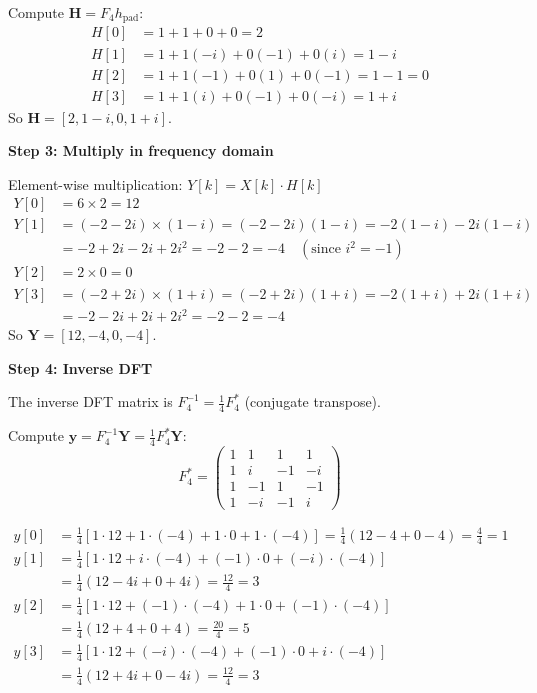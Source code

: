 \begin{notechapter}
\begin{example}
Compute $\mathbf{H} = F_4 h_{\text{pad}}$:
\begin{align*}
H[0] &= 1 + 1 + 0 + 0 = 2 \\
H[1] &= 1 + 1(-i) + 0(-1) + 0(i) = 1 - i \\
H[2] &= 1 + 1(-1) + 0(1) + 0(-1) = 1 - 1 = 0 \\
H[3] &= 1 + 1(i) + 0(-1) + 0(-i) = 1 + i
\end{align*}
So $\mathbf{H} = [2, 1-i, 0, 1+i]$.

\vspace{0.3cm}
\textbf{Step 3: Multiply in frequency domain}

Element-wise multiplication: $Y[k] = X[k] \cdot H[k]$
\begin{align*}
Y[0] &= 6 \times 2 = 12 \\
Y[1] &= (-2-2i) \times (1-i) = (-2-2i)(1-i) = -2(1-i) -2i(1-i) \\
     &= -2 + 2i - 2i + 2i^2 = -2 - 2 = -4 \quad (\text{since } i^2 = -1) \\
Y[2] &= 2 \times 0 = 0 \\
Y[3] &= (-2+2i) \times (1+i) = (-2+2i)(1+i) = -2(1+i) + 2i(1+i) \\
     &= -2 - 2i + 2i + 2i^2 = -2 - 2 = -4
\end{align*}
So $\mathbf{Y} = [12, -4, 0, -4]$.

\vspace{0.3cm}
\textbf{Step 4: Inverse DFT}

The inverse DFT matrix is $F_4^{-1} = \frac{1}{4} F_4^*$ (conjugate transpose).

Compute $\mathbf{y} = F_4^{-1} \mathbf{Y} = \frac{1}{4} F_4^* \mathbf{Y}$:
\[
F_4^* = \begin{pmatrix}
1 & 1 & 1 & 1 \\
1 & i & -1 & -i \\
1 & -1 & 1 & -1 \\
1 & -i & -1 & i
\end{pmatrix}
\]

\begin{align*}
y[0] &= \frac{1}{4}[1\cdot 12 + 1\cdot(-4) + 1\cdot 0 + 1\cdot(-4)] =
\frac{1}{4}(12 - 4 + 0 - 4) = \frac{4}{4} = 1 \\
y[1] &= \frac{1}{4}[1\cdot 12 + i\cdot(-4) + (-1)\cdot 0 + (-i)\cdot(-4)] \\
     &= \frac{1}{4}(12 - 4i + 0 + 4i) = \frac{12}{4} = 3 \\
y[2] &= \frac{1}{4}[1\cdot 12 + (-1)\cdot(-4) + 1\cdot 0 + (-1)\cdot(-4)] \\
     &= \frac{1}{4}(12 + 4 + 0 + 4) = \frac{20}{4} = 5 \\
y[3] &= \frac{1}{4}[1\cdot 12 + (-i)\cdot(-4) + (-1)\cdot 0 + i\cdot(-4)] \\
     &= \frac{1}{4}(12 + 4i + 0 - 4i) = \frac{12}{4} = 3
\end{align*}


\end{example}
\end{notechapter}
